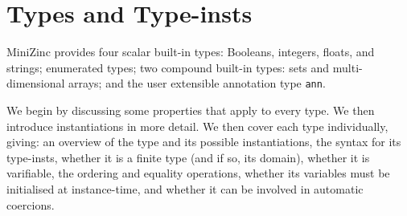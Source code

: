 \documentclass[10pt]{scrartcl}
\begin{document}
\section{Types and Type-insts}
  \label{Types}
MiniZinc provides four scalar built-in types:  Booleans, integers, floats, and
strings; enumerated types; two compound built-in types:  sets and multi-dimensional arrays;
and the user extensible annotation type \texttt{ann}.

\CommonInstantiationTypeInstDescription{}


We begin by discussing some properties that apply to every type.  We then
introduce instantiations in more detail.  We then cover each type
individually, giving:  an overview of the type and its possible
instantiations, the syntax for its type-insts, whether it is a finite
type (and if so, its domain), whether it is varifiable, the ordering and
equality operations, whether its variables must be initialised at
instance-time, and whether it can be involved in automatic coercions.  

\end{document}

